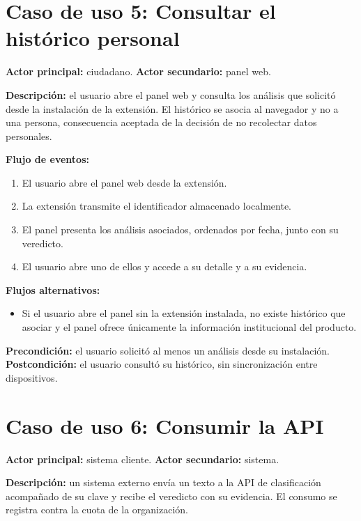 \section*{Caso de uso 5: Consultar el histórico personal}

\textbf{Actor principal:} ciudadano. \textbf{Actor secundario:} panel web.

\textbf{Descripción:} el usuario abre el panel web y consulta los análisis que solicitó desde la instalación de la extensión. El histórico se asocia al navegador y no a una persona, consecuencia aceptada de la decisión de no recolectar datos personales.

\textbf{Flujo de eventos:}
\begin{enumerate}
  \item El usuario abre el panel web desde la extensión.
  \item La extensión transmite el identificador almacenado localmente.
  \item El panel presenta los análisis asociados, ordenados por fecha, junto con su veredicto.
  \item El usuario abre uno de ellos y accede a su detalle y a su evidencia.
\end{enumerate}

\textbf{Flujos alternativos:}
\begin{itemize}
  \item Si el usuario abre el panel sin la extensión instalada, no existe histórico que asociar y el panel ofrece únicamente la información institucional del producto.
\end{itemize}

\textbf{Precondición:} el usuario solicitó al menos un análisis desde su instalación.
\textbf{Postcondición:} el usuario consultó su histórico, sin sincronización entre dispositivos.

\section*{Caso de uso 6: Consumir la API}

\textbf{Actor principal:} sistema cliente. \textbf{Actor secundario:} sistema.

\textbf{Descripción:} un sistema externo envía un texto a la API de clasificación acompañado de su clave y recibe el veredicto con su evidencia. El consumo se registra contra la cuota de la organización.

